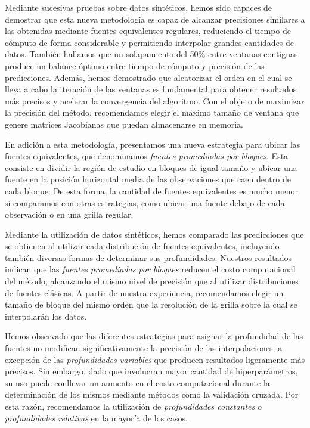Mediante sucesivas pruebas sobre datos sintéticos, hemos sido capaces de
demostrar que esta nueva metodología es capaz de alcanzar precisiones similares
a las obtenidas mediante fuentes equivalentes regulares, reduciendo el tiempo
de cómputo de forma considerable y permitiendo interpolar grandes cantidades de
datos.
También hallamos que un solapamiento del 50\% entre ventanas contiguas produce
un balance óptimo entre tiempo de cómputo y precisión de las predicciones.
Además, hemos demostrado que aleatorizar el orden en el cual se lleva a cabo la
iteración de las ventanas es fundamental para obtener resultados más precisos
y acelerar la convergencia del algoritmo.
Con el objeto de maximizar la precisión del método, recomendamos elegir el
máximo tamaño de ventana que genere matrices Jacobianas que puedan almacenarse
en memoria.

En adición a esta metodología, presentamos una nueva estrategia para ubicar las
fuentes equivalentes, que denominamos \emph{fuentes promediadas por bloques}.
Esta consiste en dividir la región de estudio en bloques de igual tamaño
y ubicar una fuente en la posición horizontal media de las observaciones que
caen dentro de cada bloque.
De esta forma, la cantidad de fuentes equivalentes es mucho menor si comparamos
con otras estrategias, como ubicar una fuente debajo de cada observación o en
una grilla regular.

Mediante la utilización de datos sintéticos, hemos comparado las predicciones
que se obtienen al utilizar cada distribución de fuentes equivalentes,
incluyendo también diversas formas de determinar sus profundidades.
Nuestros resultados indican que las \emph{fuentes promediadas por bloques}
reducen el costo computacional del método, alcanzando el mismo nivel de
precisión que al utilizar distribuciones de fuentes clásicas.
A partir de nuestra experiencia, recomendamos elegir un tamaño de bloque del
mismo orden que la resolución de la grilla sobre la cual se interpolarán los
datos.

Hemos observado que las diferentes estrategias para asignar la profundidad de
las fuentes no modifican significativamente la precisión de las
interpolaciones, a excepción de las \emph{profundidades variables} que
producen resultados ligeramente más precisos.
Sin embargo, dado que involucran mayor cantidad de hiperparámetros, su uso
puede conllevar un aumento en el costo computacional durante la determinación
de los mismos mediante métodos como la validación cruzada.
Por esta razón, recomendamos la utilización de \emph{profundidades constantes}
o \emph{profundidades relativas} en la mayoría de los casos.

